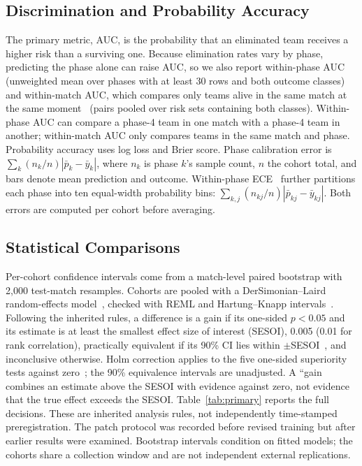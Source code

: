 \documentclass[sigconf,anonymous,nonacm]{acmart}
\begin{document}
\subsection{Discrimination and Probability Accuracy}
The primary metric, AUC, is the probability that an eliminated team receives a higher risk than a surviving one.
Because elimination rates vary by phase, predicting the phase alone can raise AUC, so we also report within-phase AUC (unweighted mean over phases with at least 30 rows and both outcome classes) and within-match AUC, which compares only teams alive in the same match at the same moment~\cite{HeagertyZheng05} (pairs pooled over risk sets containing both classes).
Within-phase AUC can compare a phase-4 team in one match with a phase-4 team in another; within-match AUC only compares teams in the same match and phase. Probability accuracy uses log loss and Brier score. Phase calibration error is $\sum_k(n_k/n)|\bar p_k-\bar y_k|$, where $n_k$ is phase $k$'s sample count, $n$ the cohort total, and bars denote mean prediction and outcome. Within-phase ECE~\cite{Naeini15} further partitions each phase into ten equal-width probability bins: $\sum_{k,j}(n_{kj}/n)|\bar p_{kj}-\bar y_{kj}|$. Both errors are computed per cohort before averaging.

\subsection{Statistical Comparisons}
Per-cohort confidence intervals come from a match-level paired bootstrap with 2,000 test-match resamples.
Cohorts are pooled with a DerSimonian--Laird random-effects model~\cite{DerSimonian86}, checked with REML and Hartung--Knapp intervals~\cite{HartungKnapp01}.
Following the inherited rules, a difference is a gain if its one-sided $p<0.05$ and its estimate is at least the smallest effect size of interest (SESOI), 0.005 (0.01 for rank correlation), practically equivalent if its 90\% CI lies within $\pm$SESOI~\cite{Schuirmann87}, and inconclusive otherwise.
Holm correction applies to the five one-sided superiority tests against zero~\cite{Holm79}; the 90\% equivalence intervals are unadjusted. A ``gain combines an estimate above the SESOI with evidence against zero, not evidence that the true effect exceeds the SESOI. Table~\ref{tab:primary} reports the full decisions. These are inherited analysis rules, not independently time-stamped preregistration. The patch protocol was recorded before revised training but after earlier results were examined. Bootstrap intervals condition on fitted models; the cohorts share a collection window and are not independent external replications.
\end{document}
